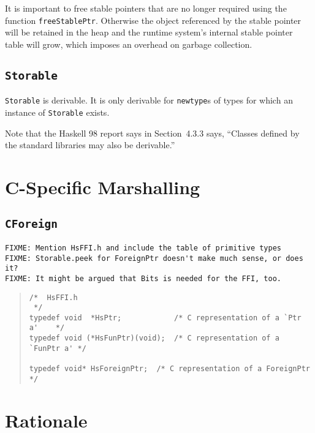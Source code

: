 \documentclass[a4paper,twosides]{article}
\newcommand{\code}[1]{\texttt{#1}}      %
\begin{document}
It is important to free stable pointers that are no longer required using the
function \code{freeStablePtr}.  Otherwise the object referenced by the stable
pointer will be retained in the heap and the runtime system's internal stable
pointer table will grow, which imposes an overhead on garbage collection.

\subsection{\code{Storable}}
\label{sec:Storable}

\code{Storable} is derivable.  It is only derivable for \code{newtype}s of
types for which an instance of \code{Storable} exists.


Note that the Haskell 98 report says in Section~4.3.3 says, ``Classes defined
by the standard libraries may also be derivable.''


\newpage
\section{C-Specific Marshalling}
\label{sec:c-marshalling}

\subsection{\code{CForeign}}

\begin{verbatim}
FIXME: Mention HsFFI.h and include the table of primitive types
FIXME: Storable.peek for ForeignPtr doesn't make much sense, or does it?
FIXME: It might be argued that Bits is needed for the FFI, too.
\end{verbatim}

\begin{quote}
\begin{verbatim}
/*  HsFFI.h
 */
typedef void  *HsPtr;            /* C representation of a `Ptr a'    */
typedef void (*HsFunPtr)(void);  /* C representation of a `FunPtr a' */

typedef void* HsForeignPtr;  /* C representation of a ForeignPtr */
\end{verbatim}
\end{quote}


\appendix
\newpage
\section{Rationale}
\end{document}
